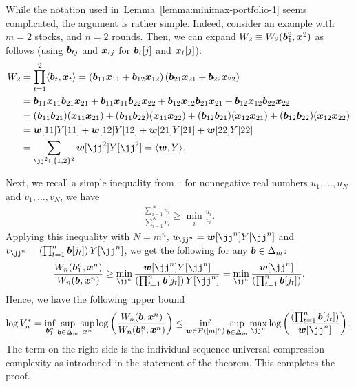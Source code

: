 \documentclass[12pt]{article}
\begin{document}
\begin{example}
    While the notation used in~Lemma~\ref{lemma:minimax-portfolio-1} seems complicated, the argument is rather simple. Indeed, consider an example with $m=2$ stocks, and $n=2$ rounds. Then, we can expand $W_2 \equiv W_2(\boldsymbol{b}_1^2, {\boldsymbol x}^2)$ as follows (using $\boldsymbol{b}_{tj}$ and ${\boldsymbol x}_{tj}$ for $\boldsymbol{b}_t[j]$ and ${\boldsymbol x}_t[j]$): 
    \begin{align}
        W_2 &= \prod_{t=1}^2 \langle \bb_t, \x_t \rangle =  \lp \bb_{11} \x_{11} + \bb_{12} \x_{12} \rp \lp \bb_{21} \x_{21} + \bb_{22} \x_{22} \rp \\
        & = \bb_{11} \x_{11} \bb_{21} \x_{21} + \bb_{11} \x_{11} \bb_{22} \x_{22} + \bb_{12} \x_{12} \bb_{21} \x_{21} + \bb_{12} \x_{12} \bb_{22} \x_{22}  \\
        & = (\bb_{11} \bb_{21})(\x_{11} \x_{21}) + (\bb_{11} \bb_{22})(\x_{11} \x_{22}) + (\bb_{12} \bb_{21})(\x_{12} \x_{21}) + (\bb_{12} \bb_{22})(\x_{12} \x_{22})  \\
        & = \w[11] Y[11] + \w[12]Y[12] + \w[21]Y[21] + \w[22] Y[22] \\
        & = \sum_{\jj^2 \in \{1, 2\}^2 } \w[\jj^2] Y[\jj^2] = \langle \w, Y \rangle. 
    \end{align}
\end{example}

Next, we recall a simple inequality from~\citet[Lemma 16.7.1]{cover2006elements}: for nonnegative real numbers $u_1, \ldots, u_N$ and $v_1, \ldots, v_N$, we have 
\begin{align}
    \frac{\sum_{i=1}^N u_i}{\sum_{i=1}^N v_i} \geq \min_{i} \frac{u_i}{v_i}.    \label{eq:cover-thomas-inequality} 
\end{align}
Applying this inequality with $N=m^n$, $u_{\jj^n} = \w[\jj^n] Y[\jj^n]$ and $v_{\jj^n} = \lp \prod_{t=1}^n \bb[j_t] \rp Y[\jj^n]$, we get the following for any $\boldsymbol{b}\in \Delta_m$: 
\begin{align}
    \frac{W_n(\bb_1^n, \x^n)}{W_n(\bb, \x^n)} \geq \min_{\jj^n} \frac{\w[\jj^n] Y[\jj^n]}{\lp \prod_{t=1}^n \bb[j_t] \rp Y[\jj^n]} =  \min_{\jj^n} \frac{\w[\jj^n] }{\lp \prod_{t=1}^n \bb[j_t] \rp }. 
\end{align}
Hence, we have the following upper bound 
\begin{align}
    \log V_n^* = \inf_{\bb_1^n} \sup_{\bb \in \Delta_m} \sup_{\x^n} \log \lp \frac{W_n(\bb, \x^n)}{W_n(\bb_1^n, \x^n)} \rp \leq \inf_{\w \in \calP([m]^n)}\sup_{\bb \in \Delta_m} \max_{\jj^n} \log\lp  \frac {\lp \prod_{t=1}^n \bb[j_t] \rp }{\w[\jj^n] } \rp. 
\end{align}
The term on the right side is the individual sequence universal compression complexity as introduced in the statement of the theorem. This completes the proof. \hfill \qedsymbol
\end{document}
